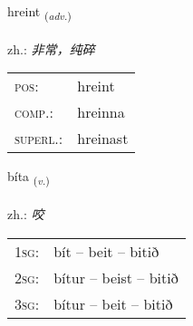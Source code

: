 \documentclass[frontgrid, backgrid]{flacards}\usepackage[]{graphicx}\usepackage[]{xcolor}
\begin{document}
\renewcommand{\blhead}{\vskip5pt {\small\bfseries\footnotesize Atviksorð | 副词 }}
\renewcommand{\bcfoot}{\vskip5pt \hspace{2pt}{\small\bfseries\footnotesize 3K}}


{hreint \small{\textsubscript{(\textit{adv.})}} \\[1ex] %
\textphonetic{[r̥ein̥t]} \\
zh.: \emph{非常，纯碎} \\  [2ex]
\renewcommand*{\arraystretch}{0.8}
\begin{tabular}{ll}
\textsc{pos}: & hreint \\ 
\textsc{comp.}: & hreinna \\ 
\textsc{superl.}: & hreinast \\
\end{tabular}
}

\renewcommand{\flhead}{\vskip5pt \fboxsep=0pt {\small\bfseries\footnotesize Sagnorð | 动词}}
\renewcommand{\fcfoot}{\vskip5pt \fboxsep=0pt \hspace{2pt}{\small\bfseries\footnotesize 3K}}

\renewcommand{\blhead}{\vskip5pt {\small\bfseries\footnotesize Sagnorð | 动词 }}
\renewcommand{\bcfoot}{\vskip5pt \hspace{2pt}{\small\bfseries\footnotesize 3K}}


{bíta \small{\textsubscript{(\textit{v.})}} \\[1ex] %
\textphonetic{[piːta]} \\
zh.: \emph{咬} \\  [2ex]
\renewcommand*{\arraystretch}{0.8}
\begin{tabular}{p{1cm}l}
\textsc{1sg}: & bít -- beit -- bitið \\ 
\textsc{2sg}: & bítur -- beist -- bitið \\ 
\textsc{3sg}: & bítur -- beit -- bitið \\ 
\end{tabular}
}

\renewcommand{\flhead}{\vskip5pt \fboxsep=0pt {\small\bfseries\footnotesize Nafnorð | 名词}}
\renewcommand{\fcfoot}{\vskip5pt \fboxsep=0pt \hspace{2pt}{\small\bfseries\footnotesize 3K}}
\end{document}
